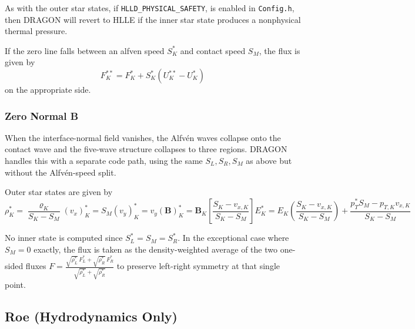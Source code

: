 \documentclass[11pt]{report}
\newcommand{\cpp}[1]{\lstinline[language=C++]{#1}}
\newcommand{\bash}[1]{\lstinline[language=bash]{#1}}
\begin{document}
As with the outer star states, if \cpp{HLLD_PHYSICAL_SAFETY}, is enabled in \bash{Config.h}, then DRAGON will revert to HLLE if the inner star state produces a nonphysical thermal pressure.

If the zero line falls between an alfven speed $S_K^*$ and contact speed $S_M$, the flux is given by 
\begin{equation}
F_K^{**} = F_K^* + S_K^*(U_K^{**} - U_K^*)
\end{equation}
 on the appropriate side.


\subsubsection{Zero Normal B}

When the interface-normal field vanishes, the Alfv\'en waves collapse onto the contact wave and the five-wave structure collapses to three regions. DRAGON handles this with a separate code path, using the same $S_L, S_R, S_M$ as above but without the Alfv\'en-speed split.

Outer star states are given by
\begin{subequations}
\begin{equation}\rho_K^{*} = \frac{\varrho_K}{S_K - S_M}\end{equation}
\begin{equation}(v_x)_K^{*} = S_M\end{equation}
\begin{equation}(v_y)_K^{*} =  v_y \end{equation}
\begin{equation}(\mathbf{B})_K^{*} =\mathbf{B}_{K} \left[\frac{S_K - v_{x,K}}{S_K-S_M}\right] \end{equation}
\begin{equation}E_K^{*} = 
E_K \left(\frac{S_K-v_{x,K}}{S_K-S_M}\right) +  \frac{p_T^*S_M - p_{T,K}v_{x,K}}{S_K-S_M}
\end{equation}
\end{subequations}

No inner state is computed since $S_L^* = S_M = S_R^*$.  In the exceptional case where $S_M = 0$ exactly, the flux is taken as the density-weighted average
of the two one-sided fluxes $F = \frac{\sqrt{\rho_L^{*}}\,F_L^{*} + \sqrt{\rho_R^{*}}\,F_R^{*}}
{\sqrt{\rho_L^{*}}+\sqrt{\rho_R^{*}}}$ to preserve left-right
symmetry at that single point.


\subsection{Roe (Hydrodynamics Only)}
\end{document}
